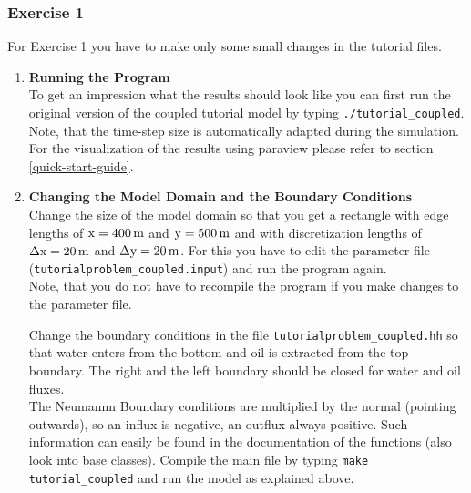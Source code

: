 \subsubsection{Exercise 1}
\renewcommand{\labelenumi}{\alph{enumi})} For Exercise 1 you have
to make only some small changes in the tutorial files.  

\begin{enumerate}

\item \textbf{Running the Program} \\
  To get an impression what the results should look like you can first run the original version of 
the coupled tutorial model by typing  \texttt{./tutorial\_coupled}. 
Note, that the time-step size is automatically adapted during the simulation. 
For the visualization of the results using paraview please refer to section \ref{quick-start-guide}.


\item \textbf{Changing the Model Domain and the Boundary Conditions} \\
  Change the size of the model domain so that you get a rectangle with
  edge lengths of $\text{x} = \unit[400]{m}$ and $\text{y} = \unit[500]{m}$ and with
  discretization lengths of $\Delta \text{x} = \unit[20]{m}$ and $\Delta
  \text{y} = \unit[20]{m}$. For this you have to edit the parameter file (\texttt{tutorialproblem\_coupled.input}) 
  and run the program again.\\
  Note, that you do not have to recompile the program if you make changes to the parameter file.

  
  Change the boundary conditions in the file
  \texttt{tutorialproblem\_coupled.hh} so that water enters from the
  bottom and oil is extracted from the top boundary. The right and the
  left boundary should be closed for water and oil fluxes. \\
  The Neumannn Boundary conditions are multiplied by the normal (pointing outwards), so an influx is negative, an outflux always positive. 
  Such information can easily be found in the documentation of the functions (also look into base classes).
  Compile the main file by typing \texttt{make tutorial\_coupled} and
  run the model as explained above.


\end{enumerate}
